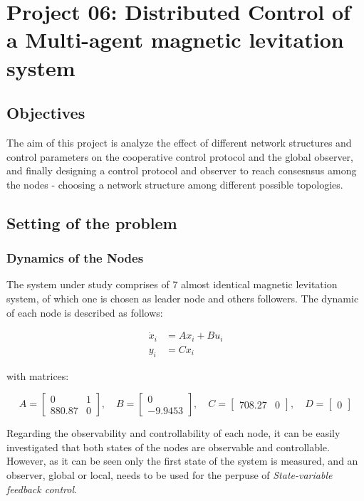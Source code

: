 \chapter{Project 06: Distributed Control of a Multi-agent magnetic levitation system}

\section{Objectives}
The aim of this project is analyze the effect of different network structures and control parameters on the cooperative control protocol and the global observer, and finally designing a control protocol and observer to reach consesnsus among the nodes - choosing a network structure among different possible topologies.

\section{Setting of the problem}
\subsection{Dynamics of the Nodes}
The system under study comprises of 7 almost identical magnetic levitation system, of which one is chosen as leader node and others followers. The dynamic of each node is described as follows:


\begin{align*}
\dot{x}_i &= A x_i + B u_i \\
y_i &= C x_i
\end{align*}

with matrices:

\[
A = \begin{bmatrix}
0 & 1 \\
880.87 & 0
\end{bmatrix}, \quad
B = \begin{bmatrix}
0 \\
-9.9453
\end{bmatrix}, \quad
C = \begin{bmatrix}
708.27 & 0
\end{bmatrix}, \quad
D = \begin{bmatrix}
0
\end{bmatrix}
\]

Regarding the observability and controllability of each node, it can be easily investigated that both states of the nodes are observable and controllable. However, as it can be seen only the first state of the system is measured, and an observer, global or local, needs to be used for the perpuse of \textit{State-variable feedback control}. 

